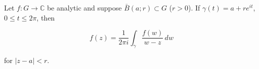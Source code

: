 Let $f: G \to \mathbb{C}$ be analytic and suppose $\bar{B}(a; r) \subset G$ ($r > 0$). If $\gamma(t) = a + re^{it}$, $0 \leq t \leq 2\pi$, then

$$f(z) = \frac{1}{2\pi i} \int_{\gamma} \frac{f(w)}{w - z} \, dw$$

for $|z - a| < r$.
